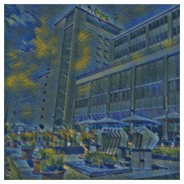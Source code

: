 \begin{figure}[H]
\begin{subfigure}[h]{0.15\textwidth}
    \end{subfigure}
    \begin{subfigure}[h]{0.15\textwidth}
        \centering
        \includegraphics[width=\textwidth]{resources/content/experiments/net3.jpg}
    \end{subfigure} \\


\end{figure}
